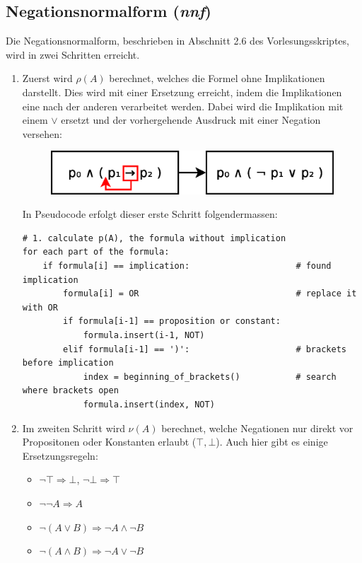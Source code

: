 \documentclass[11pt,a4paper,ngerman]{scrreprt}
\begin{document}
\subsection{Negationsnormalform (\textit{nnf})}
Die Negationsnormalform, beschrieben in Abschnitt 2.6 des Vorlesungsskriptes, wird in zwei Schritten erreicht.

\begin{enumerate}
 \item Zuerst wird $\rho(A)$ berechnet, welches die Formel ohne Implikationen darstellt. Dies wird mit einer Ersetzung erreicht, indem die Implikationen eine nach der anderen verarbeitet werden. Dabei wird die Implikation mit einem $\vee$ ersetzt und der vorhergehende Ausdruck mit einer Negation versehen:
 \begin{figure}[ht]
 \centering
 \includegraphics[width=.7\linewidth]{pics/implication.eps}
 \end{figure}

 In Pseudocode erfolgt dieser erste Schritt folgendermassen:
 \begin{lstlisting}
# 1. calculate p(A), the formula without implication
for each part of the formula:
    if formula[i] == implication:                     # found implication
        formula[i] = OR                               # replace it with OR
        if formula[i-1] == proposition or constant:
            formula.insert(i-1, NOT)
        elif formula[i-1] == ')':                     # brackets before implication
            index = beginning_of_brackets()           # search where brackets open
            formula.insert(index, NOT)
\end{lstlisting}
 
  \item Im zweiten Schritt wird $\nu(A)$ berechnet, welche Negationen nur direkt vor Propositonen oder Konstanten erlaubt ($\top, \bot$). Auch hier gibt es einige Ersetzungsregeln:
  \begin{itemize}
   \item $\neg \top \Rightarrow \bot$, $\neg \bot \Rightarrow \top$
   \item $\neg \neg A \Rightarrow A$
   \item $\neg (A \vee B) \Rightarrow \neg A \wedge \neg B$
   \item $\neg (A \wedge B) \Rightarrow \neg A \vee \neg B$
  \end{itemize}
\end{enumerate}
\end{document}
